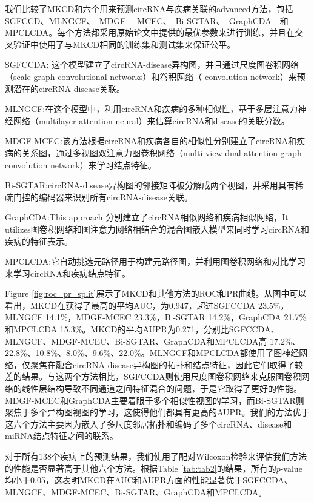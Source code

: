 \documentclass{bioinfo}
\begin{document}
\begin{methods}
我们比较了MKCD和六个用来预测circRNA与疾病关联的advanced方法，包括SGFCCD\cite{shang2024sgfccda}、MLNGCF\cite{wu2023mlngcf}、\ MDGF\ -\ MCEC\cite{wu2022mdgf}、\ Bi-SGTAR\cite{li2024bi}、\ GraphCDA\cite{dai2022graphcda}\ \ 和\\MPCLCDA\cite{liu2023mpclcda}。每个方法都采用原始论文中提供的最优参数来进行训练，并且在交叉验证中使用了与MKCD相同的训练集和测试集来保证公平。

SGFCCDA: 这个模型建立了circRNA-disease异构图，并且通过尺度图卷积网络（scale graph convolutional networks）和卷积网络（ convolution network）来预测潜在的circRNA-disease关联。

MLNGCF:在这个模型中，利用circRNA和疾病的多种相似性，基于多层注意力神经网络（multilayer attention neural）来估算circRNA和disease的关联分数。

MDGF-MCEC:该方法根据circRNA和疾病各自的相似性分别建立了circRNA和疾病的关系图，通过多视图双注意力图卷积网络（multi-view dual attention graph convolution network）来学习结点特征。

Bi-SGTAR:circRNA-disease异构图的邻接矩阵被分解成两个视图，并采用具有稀疏门控的编码器来识别所有circRNA-disease关联。

GraphCDA:This approach 分别建立了circRNA相似网络和疾病相似网络，It utilizes图卷积网络和图注意力网络相结合的混合图嵌入模型来同时学习circRNA和疾病的特征表示。

MPCLCDA:它自动挑选元路径用于构建元路径图，并利用图卷积网络和对比学习来学习circRNA和疾病结点特征。

Figure \ref{fig:roc_pr_split}展示了MKCD和其他方法的ROC和PR曲线。从图中可以看出，MKCD在获得了最高的平均AUC，为0.947，超过SGFCCDA 23.5\%，MLNGCF 14.1\%，MDGF-MCEC 23.3\%，Bi-SGTAR 14.2\%，GraphCDA 21.7\%和MPCLCDA 15.3\%。MKCD的平均AUPR为0.271，分别比SGFCCDA、MLNGCF、MDGF-MCEC、Bi-SGTAR、GraphCDA和MPCLCDA高 17.2\%、22.8\%、10.8\%、8.0\%、9.6\%、22.0\%。MLNGCF和MPCLCDA都使用了图神经网络，仅聚焦在融合circRNA-disease异构图的拓扑和结点特征，因此它们取得了较差的结果。与这两个方法相比，SGFCCDA则使用尺度图卷积网络来克服图卷积网络的线性层结构导致不同通道之间特征混合的问题，于是它取得了更好的性能。MDGF-MCEC和GraphCDA主要着眼于多个相似性视图的学习，而Bi-SGTAR则聚焦于多个异构图视图的学习，这使得他们都具有更高的AUPR。我们的方法优于这六个方法主要因为嵌入了多尺度邻居拓扑和编码了多个circRNA、disease和miRNA结点特征之间的联系。


对于所有138个疾病上的预测结果，我们使用了配对Wilcoxon检验来评估我们方法的性能是否显著高于其他六个方法。根据Table \ref{tab:tab2}的结果，所有的$p$-value均小于0.05，这表明MKCD在AUC和AUPR方面的性能显著优于SGFCCDA、MLNGCF、MDGF-MCEC、Bi-SGTAR、GraphCDA和MPCLCDA。



\end{methods}
\end{document}

